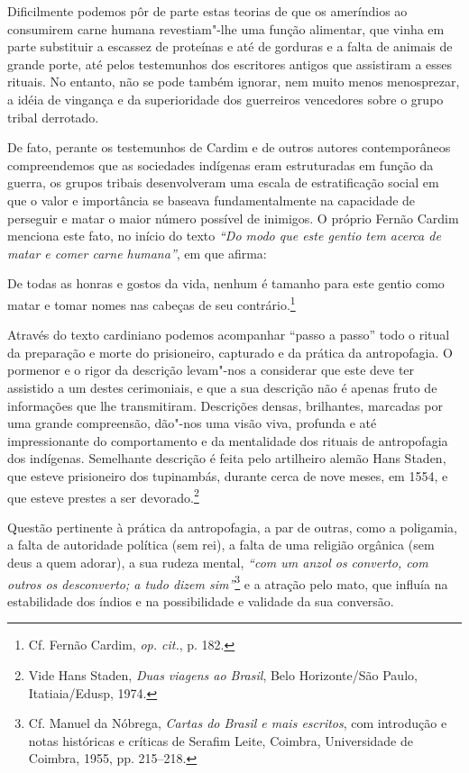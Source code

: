 Dificilmente podemos pôr de parte estas teorias de que os ameríndios
ao consumirem carne humana revestiam"-lhe uma função alimentar, que
vinha em parte substituir a escassez de proteínas e até de gorduras e a
falta de animais de grande porte, até pelos testemunhos dos escritores
antigos que assistiram a esses rituais. No entanto, não se pode também
ignorar, nem muito menos menosprezar, a idéia de vingança e da
superioridade dos guerreiros vencedores sobre o grupo tribal derrotado.

De fato, perante os testemunhos de Cardim e de outros autores
contemporâneos compreendemos que as sociedades indígenas eram
estruturadas em função da guerra, os grupos tribais desenvolveram uma
escala de estratificação social em que o valor e importância se baseava
fundamentalmente na capacidade de perseguir e matar o maior número
possível de inimigos. O próprio Fernão Cardim menciona este fato, no
início do texto \textit{``Do modo que este gentio tem
acerca de matar e comer carne humana''}, em que afirma:

\begin{hedraquote}
De todas as honras e gostos da vida, nenhum é tamanho para este gentio
como matar e tomar nomes nas cabeças de seu contrário.\footnote{ Cf. Fernão 
Cardim, \textit{op. cit.}, p. 182.} 
\end{hedraquote}

Através do texto cardiniano podemos acompanhar ``passo a passo'' todo
o ritual da preparação e morte do prisioneiro, capturado e da prática
da antropofagia. O pormenor e o rigor da descrição levam"-nos a
considerar que este deve ter assistido a um destes cerimoniais, e que a
sua descrição não é apenas fruto de informações que lhe transmitiram.
Descrições densas, brilhantes, marcadas por uma grande compreensão,
dão"-nos uma visão viva, profunda e até impressionante do comportamento
e da mentalidade dos rituais de antropofagia dos indígenas. Semelhante
descrição é feita pelo artilheiro alemão Hans Staden, que esteve
prisioneiro dos tupinambás, durante cerca de nove meses, em 1554, e que
esteve prestes a ser devorado.\footnote{ Vide Hans Staden,
\textit{Duas viagens ao Brasil}, Belo Horizonte/São Paulo, Itatiaia/Edusp, 1974.} 

Questão pertinente à prática da antropofagia, a par de outras, como a
poligamia, a falta de autoridade política (sem rei), a falta de uma
religião orgânica (sem deus a quem adorar), a sua rudeza mental,
\textit{``com um anzol os converto, com outros os desconverto; a tudo
dizem sim''}\footnote{ Cf. Manuel da Nóbrega, \textit{Cartas do
Brasil e mais escritos}, com introdução e notas históricas e críticas
de Serafim Leite, Coimbra, Universidade de Coimbra, 1955, pp. 215--218.}
e a atração pelo mato, que influía na estabilidade dos índios e na
possibilidade e validade da sua conversão. 


